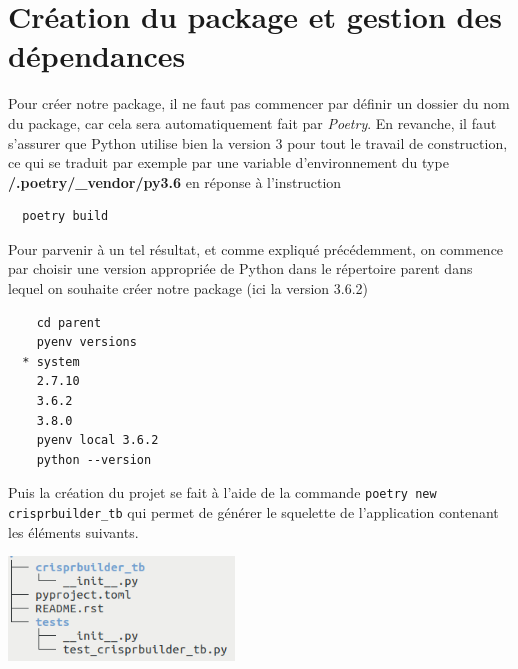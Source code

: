 \documentclass[twoside,a4paper,11pt,frenchb,openany]{report}
\begin{document}
\section{Création du package et gestion des dépendances}

Pour créer notre package, il ne faut pas commencer par définir un dossier du nom du package, car cela sera automatiquement fait par \textit{Poetry}. En revanche, il faut s'assurer que Python utilise bien la version 3 pour tout le travail de construction, ce qui se traduit par exemple par une variable d'environnement du type \textbf{\raisebox{-1ex}{\textasciitilde}/.poetry/\_vendor/py3.6} en réponse à l'instruction 
\begin{verbatim}  poetry build\end{verbatim}
Pour parvenir à un tel résultat, et comme expliqué précédemment, on commence par choisir une version appropriée de Python dans le répertoire parent dans lequel on souhaite créer notre package (ici la version 3.6.2)
 \begin{verbatim}    cd parent
    pyenv versions
  * system
    2.7.10
    3.6.2
    3.8.0
    pyenv local 3.6.2
    python --version\end{verbatim}

Puis la création du projet se fait à l'aide de la commande
\texttt{poetry new crisprbuilder\_tb}
qui permet de générer le squelette de l'application contenant les éléments suivants.

\includegraphics[width=6cm]{nom_package_tree.png}
\end{document}
